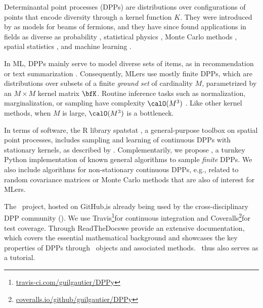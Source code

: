 \documentclass[twoside,11pt]{article}
\begin{document}
    Determinantal point processes (DPPs) are distributions over configurations of points that encode diversity through a kernel function $K$.
    They were introduced by \citet{Mac75} as models for beams of fermions, and they have since found applications in fields as diverse as probability \citep{Sos00, Kon05, HKPV06}, statistical physics \citep{PaBe11}, Monte Carlo methods \citep{BaHa16}, spatial statistics \citep{LaMoRu15}, and machine learning \citep[ML,][]{KuTa12}.

    In ML, DPPs mainly serve to model diverse sets of items, as in recommendation \citep{KaDeKo16, GaPaKo16} or text summarization \citep{DuBa18}.
    Consequently, MLers  use mostly finite DPPs, which are distributions over subsets of a finite \emph{ground set} of cardinality $M$, parametrized by an $M\times M$ kernel matrix $\bfK$.
    Routine inference tasks such as normalization, marginalization, or sampling have complexity $\calO(M^3)$ \citep{Gil14}.
    Like other kernel methods, when $M$ is large, $\calO(M^3)$ is a bottleneck.

    In terms of software, the R library \textsf{spatstat} \citep{BaTu05}, a general-purpose toolbox on spatial point processes, includes sampling and learning of continuous DPPs with stationary kernels, as described by .
    Complementarily, we propose \DPPy, a turnkey Python implementation of known general algorithms to sample \emph{finite} DPPs.
    We also include algorithms for non-stationary continuous DPPs, e.g., related to random covariance matrices or Monte Carlo methods that are also of interest for MLers.

    The \DPPy\ project, hosted on GitHub,\!is already being used by the cross-disciplinary DPP community (\citealp{BuRaWi19,Kam18,Pou19,DeCaVa19,GaBaVa19}).
    We use \setcounter{footnote}{5}Travis\!\footnote{\href{https://travis-ci.com/guilgautier/DPPy}{\textsf{travis-ci.com/guilgautier/DPPy}}}for continuous integration and Coveralls\!\footnote{\href{https://coveralls.io/github/guilgautier/DPPy}{\textsf{coveralls.io/github/guilgautier/DPPy}}}for test coverage.
    Through ReadTheDocs\hspace{1pt}we provide an extensive documentation, which covers the essential mathematical background and showcases the key properties of DPPs through \DPPy\ objects and associated methods.
    \DPPy\ thus also serves as a tutorial.
\end{document}
